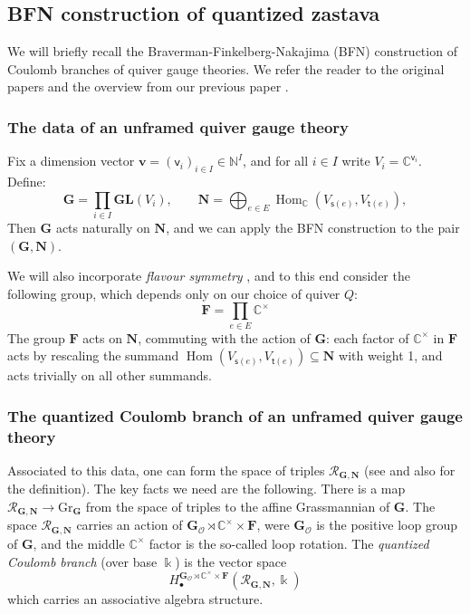 \documentclass[11pt,reqno]{amsart}
\renewcommand{\mathbf}{\mathbold}
\numberwithin{equation}{section}
\theoremstyle{definition}
\newcommand{\bF}{\mathbf{F}}
\newcommand{\bG}{\mathbf{G}}
\newcommand{\bN}{\mathbf{N}}
\newcommand{\cO}{\mathcal{O}}
\newcommand{\cR}{\mathcal{R}}
\newcommand{\bv}{\mathbf{v}}
\newcommand{\CC}{\mathbb{C}}
\newcommand{\NN}{\mathbb{N}}
\DeclareMathOperator{\Hom}{Hom}
\newcommand{\GL}{\mathbf{GL}}
\newcommand{\Gr}{\mathrm{Gr}}
\newcommand{\kk}{\Bbbk}
\renewcommand{\bv}{\mathbf{v}} %
\newcommand{\sv}{\mathsf{v}}
\newcommand{\source}{\mathsf{s}}
\newcommand{\target}{\mathsf{t}}
\newcommand{\vertexset}{I}
\newcommand{\arrowset}{E}
\begin{document}
\subsection{BFN construction of quantized zastava}
We will briefly recall the Braverman-Finkelberg-Nakajima (BFN) construction of Coulomb branches of quiver gauge theories. We refer the reader to the original papers \cite{BFN1,BFN2} and the overview from our previous paper \cite[\S 3]{MW2}.

\subsubsection{The data of an unframed quiver gauge theory}

Fix a dimension vector $\bv = (\sv_i)_{i \in \vertexset} \in \NN^\vertexset$, and for all $i \in \vertexset$ write $V_i = \CC^{\sv_i}$. Define:
\begin{equation}
\label{eq:01}
\bG = \prod_{i \in \vertexset} \GL(V_i), \qquad \bN = \bigoplus_{e \in \arrowset}  \Hom_\CC( V_{\source(e)}, V_{\target(e)} ), 
\end{equation}
Then $\bG$ acts naturally on $\bN$, and we can apply the BFN construction \cite{BFN1} to the pair $(\bG,\bN)$.


We will also incorporate \emph{flavour symmetry} \cite[\S 3(viii)]{BFN1}, and to this end consider the following group, which depends only on our choice of quiver $Q$:
\begin{equation}
\bF = \prod_{e \in \arrowset} \CC^\times
\end{equation}
The group $\bF$ acts on $\bN$, commuting with the action of $\bG$: each factor of $\CC^\times$ in $\bF$ acts by rescaling the summand  $ 
\Hom(V_{\source(e)}, V_{\target(e)}) \subseteq \bN$ with weight 1, and acts trivially on all other summands.

\subsubsection{The quantized Coulomb branch of an unframed quiver gauge theory}
Associated to this data, one can form the space of triples $\cR_{\bG,\bN}$ (see \cite[\S 2(i)]{BFN1} and also \cite[\S 3.1]{MW2} for the definition). The key facts we need are the following. There is a map $\cR_{\bG,\bN} \rightarrow \Gr_{\bG}$ from the space of triples to the affine Grassmannian of $\bG$. The space $\cR_{\bG,\bN}$ carries an action of $\bG_{\cO} \rtimes \CC^\times \times \bF$, were $\bG_{\cO}$ is the positive loop group of $\bG$, and the middle $\CC^\times$ factor is the so-called loop rotation.  The \emph{quantized Coulomb branch} (over base $\kk$) is the vector space
\begin{equation}
  \label{eq:50}
  H^{\bG_\cO \rtimes \CC^\times \times \bF}_{\bullet}(\cR_{\bG,\bN},\kk)
\end{equation}
which carries an associative algebra structure. 
\end{document}
